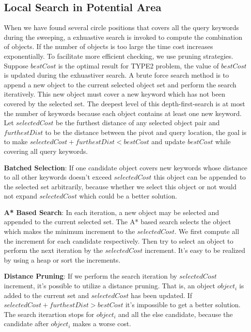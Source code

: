 \documentclass{sig-alternate}
\begin{document}
\subsection{Local Search in Potential Area}\label{subsec:search}
When we have found several circle positions that covers all the query keywords during the sweeping,
a exhuastive search is invoked to compute the combination of objects. If the number of objects
is too large the time cost increases exponentially. To facilitate more efficient checking,
we use pruning strategies. Suppose $bestCost$ is the optimal result for \textsf{TYPE2} problem,
the value of $bestCost$ is updated during the exhuastiver search. 
A brute force search method is to append a new object to the current selected object set and
perform the search iteratively.
This new object must cover a new keyword which has not been covered by the selected set.
The deepest level of this depth-first-search is at most the number of keywords because each object
contains at least one new keyword.
Let $selectedCost$ be the furthest distance of any selected object pair and
$furthestDist$ to be the distance between the pivot and query location, the goal is to
make $selectedCost+furthestDist<bestCost$ and update $bestCost$ while covering all query keywords.
%

\textbf{Batched Selection}: If one candidate object covers new keywords whose distance to all other keywords doesn't exceed
$selectedCost$ this object can be appended to the selected set arbitrarily, because whether we select
this object or not would not expand $selectedCost$ which could be a better solution.

\textbf{A* Based Search}: In each iteration, a new object may be selected and
appended to the current selected set. The A* based search selects the object which
makes the minimum increment to the $selectedCost$. We first compute all the increment
for each candidate respectively. Then try to select an object to perform the next
iteration by the $selectedCost$ increment. It's easy to be realized by using a heap or
sort the increments.

\textbf{Distance Pruning}: If we perform the search iteration by $selectedCost$ increment,
it's possible to utilize a distance pruning. That is, an object $object_i$ is added
to the current set and $selectedCost$ has been updated. If
$selectedCost+furthestDist>bestCost$ it's impossible to get a better solution. The
search iterartion stops for $object_i$ and all the else candidate, because the candidate
after $object_i$ makes a worse cost.
\end{document}
